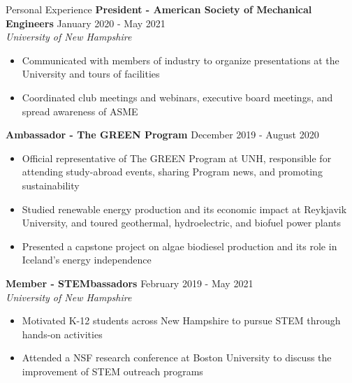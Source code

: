 \begin{rSection}{Personal Experience}
    {\bf President - American Society of Mechanical Engineers} \hfill {January 2020 - May 2021}
    \\ {\em University of New Hampshire}
    \vspace{-0.5em}
    \begin{itemize}[label={\tiny\raisebox{1ex}{\textbullet}}, noitemsep]
        \item Communicated with members of industry to organize presentations at the University and tours of facilities
        \item Coordinated club meetings and webinars, executive board meetings, and spread awareness of ASME 
    \end{itemize}
    \vspace{-0.4em}
    {\bf Ambassador - The GREEN Program} \hfill {December 2019 - August 2020}
    \vspace{-0.5em}
    \begin{itemize}[label={\tiny\raisebox{1ex}{\textbullet}}, noitemsep]
        \item Official representative of The GREEN Program at UNH, responsible for attending study-abroad events, sharing Program news, and promoting sustainability
        \item Studied renewable energy production and its economic impact at Reykjavik University, and toured geothermal, hydroelectric, and biofuel power plants
        \item Presented a capstone project on algae biodiesel production and its role in Iceland's energy independence
    \end{itemize}
    \vspace{-0.4em}
    {\bf Member - STEMbassadors} \hfill {{February 2019 - May 2021}}
    \\ {\em University of New Hampshire}
    \vspace{-0.5em}
    \begin{itemize}[label={\tiny\raisebox{1ex}{\textbullet}}, noitemsep]
        \item Motivated K-12 students across New Hampshire to pursue STEM through hands-on activities
        \item Attended a NSF research conference at Boston University to discuss the improvement of STEM outreach programs
    \end{itemize}
    \vspace{-0.4em}
\end{rSection}


